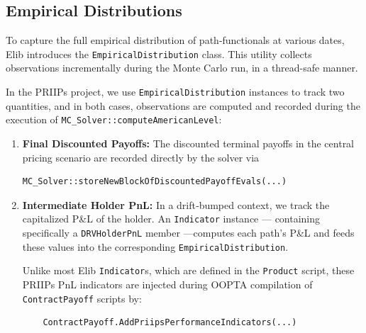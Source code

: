 \documentclass[11pt]{article}
\begin{document}


\subsection{Empirical Distributions}

To capture the full empirical distribution of path‐functionals at various dates, Elib introduces the \texttt{EmpiricalDistribution} class. This utility collects observations incrementally during the Monte Carlo run, in a thread-safe manner.

In the PRIIPs project, we use \texttt{EmpiricalDistribution} instances to track two quantities, and in both cases, observations are computed and recorded during the execution of \texttt{MC\_Solver::computeAmericanLevel}:

\begin{enumerate}
  \item \textbf{Final Discounted Payoffs:}  
    The discounted terminal payoffs in the central pricing scenario are recorded directly by the solver via  
    \begin{verbatim}
MC_Solver::storeNewBlockOfDiscountedPayoffEvals(...)
    \end{verbatim}

  \item \textbf{Intermediate Holder PnL:}  
    In a drift‐bumped context, we track the capitalized P\&L of the holder.  An \texttt{Indicator} instance — containing specifically a \texttt{DRVHolderPnL} member —computes each path’s P\&L and feeds these values into the corresponding \texttt{EmpiricalDistribution}. 
    
    Unlike most Elib \texttt{Indicator}s, which are defined in the \texttt{Product} script, these PRIIPs PnL indicators are injected during OOPTA compilation of \texttt{ContractPayoff} scripts by:  
    \begin{verbatim}
    ContractPayoff.AddPriipsPerformanceIndicators(...)
    \end{verbatim}
\end{enumerate}
\end{document}
